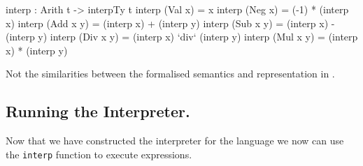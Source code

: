 \begin{code}
interp : Arith t -> interpTy t
interp (Val x)   = x
interp (Neg x)   = (-1) * (interp x)
interp (Add x y) = (interp x) + (interp y)
interp (Sub x y) = (interp x) - (interp y)
interp (Div x y) = (interp x) `div` (interp y)
interp (Mul x y) = (interp x) * (interp y)
\end{code}

\noindent
Not the similarities between the formalised semantics and representation in \idris{}.

\subsection{Running the Interpreter.}
\label{sec:running-interpreter}

Now that we have constructed the interpreter for the language we now can use the \texttt{interp} function to execute expressions.


